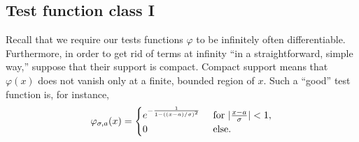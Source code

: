 \subsection{Test function class I}

Recall that we require \cite{schwartz} our tests functions $\varphi$
to be infinitely often differentiable. Furthermore, in order to get rid of terms at infinity ``in a straightforward, simple way,''
suppose that their support is compact.
Compact support means that $\varphi (x)$ does not vanish only at a finite, bounded region of $x$.
Such a ``good'' test function is, for instance,
\begin{equation}
\varphi_{\sigma ,a}(x)
=
\begin{cases}
e^{-{1\over 1-((x-a)/\sigma )^2}} & \textrm{ for } \vert  {x-a\over \sigma }\vert <1, \\
                                0 & \textrm{ else.}
\end{cases}
\end{equation}

